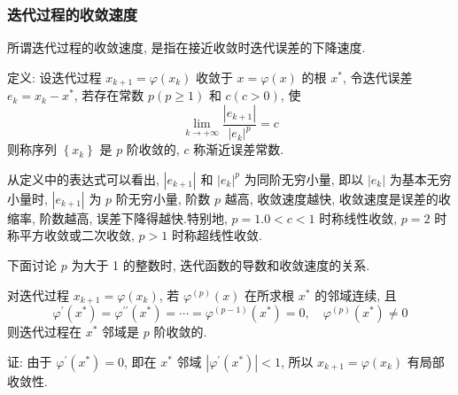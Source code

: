 \subsubsection{迭代过程的收敛速度}

所谓迭代过程的收敛速度, 是指在接近收敛时迭代误差的下降速度.

定义: 设迭代过程 $ x_{k+1}=\varphi\left(x_{k}\right) $ 收敛于 $ x=\varphi(x) $ 的根 $ x^{*} $, 令迭代误差 $ e_{k}=x_{k}-x^{*} $, 若存在常数 $ p(p \geqslant 1) $ 和 $ c(c>0) $, 使
$$
\lim _{k \rightarrow+\infty} \frac{\left|e_{k+1}\right|}{\left|e_{k}\right|^{p}}=c
$$
则称序列 $ \left\{x_{k}\right\} $ 是 $ p $ 阶收敛的, $ c $ 称渐近误差常数.

从定义中的表达式可以看出, $ \left|e_{k+1}\right| $ 和 $ \left|e_{k}\right|^{p} $ 为同阶无穷小量, 即以 $ \left|e_{k}\right| $ 为基本无穷小量时, $ \left|e_{k+1}\right| $ 为 $ p $ 阶无穷小量, 阶数 $ p $ 越高, 收敛速度越快, 收敛速度是误差的收缩率, 阶数越高, 误差下降得越快.特别地, $ p=1.0<c<1 $ 时称线性收敛, $ p=2 $ 时称平方收敛或二次收敛, $ p>1 $ 时称超线性收敛.

下面讨论 $ p $ 为大于 1 的整数时, 迭代函数的导数和收敛速度的关系.
\begin{tcolorbox}[enhanced,colback=2,colframe=1,breakable,coltitle=black,title=定理]
对迭代过程 $ x_{k+1}=\varphi\left(x_{k}\right) $, 若 $ \varphi^{(p)}(x) $ 在所求根 $ x^{*} $ 的邻域连续, 且
$$
\varphi^{\prime}\left(x^{*}\right)=\varphi^{\prime \prime}\left(x^{*}\right)=\cdots=\varphi^{(p-1)}\left(x^{*}\right)=0, \quad \varphi^{(p)}\left(x^{*}\right) \neq 0
$$
则迭代过程在 $ x^{*} $ 邻域是 $ p $ 阶收敛的.
\end{tcolorbox}

证: 由于 $ \varphi^{\prime}\left(x^{*}\right)=0 $, 即在 $ x^{*} $ 邻域 $ \left|\varphi^{\prime}\left(x^{*}\right)\right|<1 $, 所以 $ x_{k+1}=\varphi\left(x_{k}\right) $ 有局部收敛性.

